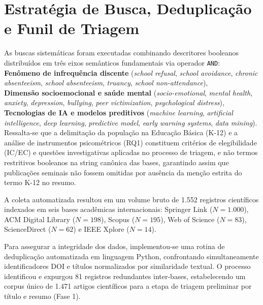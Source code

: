 \documentclass[10pt,a4paper]{article}
\begin{document}
\section{Estratégia de Busca, Deduplicação e Funil de Triagem}
As buscas sistemáticas foram executadas combinando descritores booleanos distribuídos em três eixos semânticos fundamentais via operador \texttt{AND}: \\ 
\textbf{Fenômeno de infrequência discente} (\textit{school refusal}, \textit{school avoidance}, \textit{chronic absenteeism}, \textit{school absenteeism}, \textit{truancy}, \textit{school non-attendance}), \\
\textbf{Dimensão socioemocional e saúde mental} (\textit{socio-emotional}, \textit{mental health}, \textit{anxiety}, \textit{depression}, \textit{bullying}, \textit{peer victimization}, \textit{psychological distress}), \\
\textbf{Tecnologias de IA e modelos preditivos} (\textit{machine learning}, \textit{artificial intelligence}, \textit{deep learning}, \textit{predictive model}, \textit{early warning systems}, \textit{data mining}).\\
Ressalta-se que a delimitação da população na Educação Básica (K-12) e a análise de instrumentos psicométricos (RQ1) constituem critérios de elegibilidade (IC/EC) e questões investigativas aplicadas no processo de triagem, e não termos restritivos booleanos na string canônica das bases, garantindo assim que publicações seminais não fossem omitidas por ausência da menção estrita do termo K-12 no resumo.

A coleta automatizada resultou em um volume bruto de 1.552 registros científicos indexados em seis bases acadêmicas internacionais: Springer Link ($N=1.000$), ACM Digital Library ($N=198$), Scopus ($N=195$), Web of Science ($N=83$), ScienceDirect ($N=62$) e IEEE Xplore ($N=14$).

Para assegurar a integridade dos dados, implementou-se uma rotina de deduplicação automatizada em linguagem Python, confrontando simultaneamente identificadores DOI e títulos normalizados por similaridade textual. O processo identificou e expurgou 81 registros redundantes inter-bases, estabelecendo um corpus único de 1.471 artigos científicos para a etapa de triagem preliminar por título e resumo (Fase 1).
\end{document}

